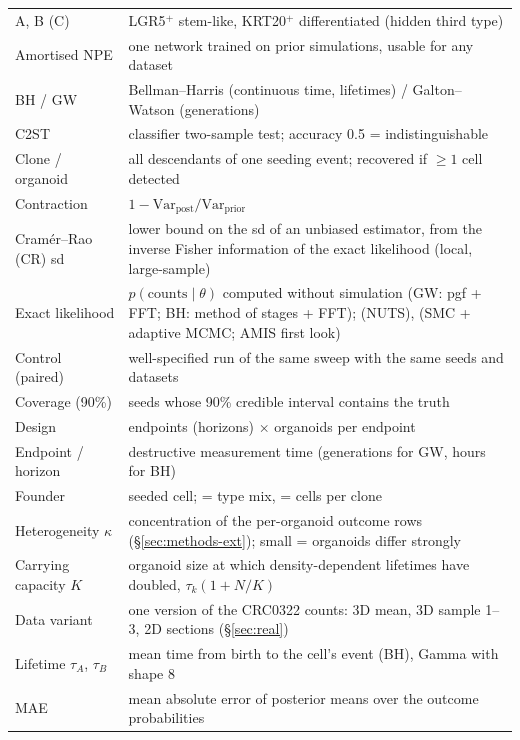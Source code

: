 \documentclass[10pt,a4paper]{article}
\newcommand{\tA}{$\tau_A$}
\newcommand{\tB}{$\tau_B$}
\newcommand{\code}[1]{\texttt{\detokenize{#1}}}
\begin{document}
\begin{center}\footnotesize
\begin{tabularx}{\linewidth}{@{}p{3.3cm}X@{}}\toprule
A, B (C) & LGR5$^+$ stem-like, KRT20$^+$ differentiated (hidden third type) \\
Amortised NPE & one network trained on prior simulations, usable for any dataset \\
BH / GW & Bellman--Harris (continuous time, lifetimes) / Galton--Watson (generations) \\
C2ST & classifier two-sample test; accuracy 0.5 = indistinguishable \\
Clone / organoid & all descendants of one seeding event; recovered if $\ge 1$ cell detected \\
Contraction & $1-\mathrm{Var}_\text{post}/\mathrm{Var}_\text{prior}$ \\
Cram\'er--Rao (CR) sd & lower bound on the sd of an unbiased estimator, from the inverse Fisher information of the exact likelihood (local, large-sample) \\
Exact likelihood & $p(\text{counts}\mid\theta)$ computed without simulation (GW: pgf + FFT; BH: method of stages + FFT); \code{exact_gw} (NUTS), \code{exact_bh} (SMC + adaptive MCMC; AMIS first look) \\
Control (paired) & well-specified run of the same sweep with the same seeds and datasets \\
Coverage (90\%) & seeds whose 90\% credible interval contains the truth \\
Design & endpoints (horizons) $\times$ organoids per endpoint \\
Endpoint / horizon & destructive measurement time (generations for GW, hours for BH) \\
Founder & seeded cell; \code{founder} = type mix, \code{founder_size} = cells per clone \\
Heterogeneity $\kappa$ & concentration of the per-organoid outcome rows (\S\ref{sec:methods-ext}); small = organoids differ strongly \\
Carrying capacity $K$ & organoid size at which density-dependent lifetimes have doubled, $\tau_k(1+N/K)$ \\
Data variant & one version of the CRC0322 counts: 3D mean, 3D sample 1--3, 2D sections (\S\ref{sec:real}) \\
Lifetime \tA, \tB & mean time from birth to the cell's event (BH), Gamma with shape 8 \\
MAE & mean absolute error of posterior means over the outcome probabilities \\

\end{tabularx}
\end{center}
\end{document}
